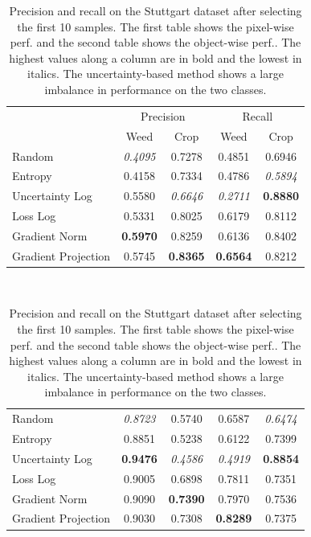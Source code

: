 \documentclass[letterpaper, 10 pt, conference]{ieeeconf}  %
\begin{document}
       \begin{table}
        \vspace{1em}
        \centering
      \caption{Precision and recall on the Stuttgart dataset after selecting the first 10 samples. The first table shows the pixel-wise perf. and the second table shows the object-wise perf.. The highest values along a column are in bold and the lowest in italics. The uncertainty-based method shows a large imbalance in performance on the two classes.}
        \begin{tabular}{@{}lcccc@{}} 
            \toprule
            & \multicolumn{2}{c}{Precision} & \multicolumn{2}{c}{Recall}\\ 
           \cmidrule{2-5} 
               & Weed & Crop & Weed & Crop \\ 
            \midrule 
    		  Random & \textit{0.4095} & 0.7278 & 0.4851 & 0.6946  \\ \addlinespace
    		  Entropy & 0.4158 & 0.7334 & 0.4786 & \textit{0.5894}  \\ \addlinespace
    		  Uncertainty Log & 0.5580 & \textit{0.6646} & \textit{0.2711} & \textbf{0.8880}  \\ \addlinespace
    		  Loss Log & 0.5331 & 0.8025 & 0.6179 & 0.8112  \\ \addlinespace
    		  Gradient Norm & \textbf{0.5970} & 0.8259 & 0.6136 & 0.8402  \\ \addlinespace
    		  Gradient Projection & 0.5745 & \textbf{0.8365} & \textbf{0.6564} & 0.8212  \\ 
            \bottomrule
        \end{tabular}
           ~\\[1mm]
                \begin{tabular}{@{}lcccc@{}} 
            \toprule
    		  Random & \textit{0.8723} & 0.5740 & 0.6587 & \textit{0.6474}  \\ \addlinespace
    		  Entropy & 0.8851 & 0.5238 & 0.6122 & 0.7399  \\ \addlinespace
    		  Uncertainty Log & \textbf{0.9476} & \textit{0.4586} & \textit{0.4919} & \textbf{0.8854}  \\ \addlinespace
    		  Loss Log & 0.9005 & 0.6898 & 0.7811 & 0.7351  \\ \addlinespace
    		  Gradient Norm & 0.9090 & \textbf{0.7390} & 0.7970 & 0.7536  \\ \addlinespace
    		  Gradient Projection & 0.9030 & 0.7308 & \textbf{0.8289} & 0.7375  \\ 
            \bottomrule
        \end{tabular}
        \label{tab:performance_10_stuttgart}
          \vspace{-2em}
    \end{table}
   
\end{document}
